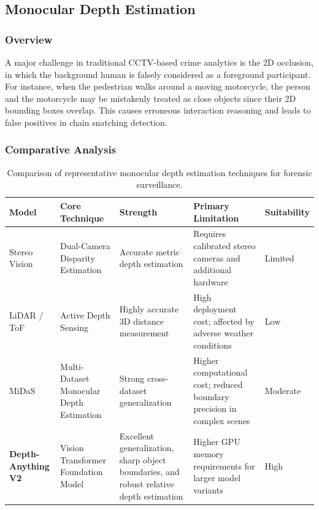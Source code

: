 \documentclass[conference]{IEEEtran}
\begin{document}
\subsection{Monocular Depth Estimation}
\subsubsection{Overview}
A major challenge in traditional CCTV-based crime analytics is the 2D occlusion, in which the background human is falsely considered as a foreground participant. For instance, when the pedestrian walks around a moving motorcycle, the person and the motorcycle may be mistakenly treated as close objects since their 2D bounding boxes overlap. This causes erroneous interaction reasoning and leads to false positives in chain snatching detection.

\subsubsection{Comparative Analysis}

\begin{table}[!t]
\centering
\scriptsize
\renewcommand{\arraystretch}{1.2}
\caption{Comparison of representative monocular depth estimation techniques for forensic surveillance.}
\label{tab:depth_comparison}

\begin{tabular}{|l|p{3.0cm}|p{3.6cm}|p{3.9cm}|p{2.4cm}|}
\hline
\textbf{Model} &
\textbf{Core Technique} &
\textbf{Strength} &
\textbf{Primary Limitation} &
\textbf{Suitability} \\ \hline

Stereo Vision &
Dual-Camera Disparity Estimation &
Accurate metric depth estimation &
Requires calibrated stereo cameras and additional hardware &
Limited \\ \hline

LiDAR / ToF &
Active Depth Sensing &
Highly accurate 3D distance measurement &
High deployment cost; affected by adverse weather conditions &
Low \\ \hline

MiDaS~\cite{monovit} &
Multi-Dataset Monocular Depth Estimation &
Strong cross-dataset generalization &
Higher computational cost; reduced boundary precision in complex scenes &
Moderate \\ \hline

\textbf{Depth-Anything V2}~\cite{yang2024depth} &
Vision Transformer Foundation Model &
Excellent generalization, sharp object boundaries, and robust relative depth estimation &
Higher GPU memory requirements for larger model variants &
High \\ \hline

\end{tabular}

\end{table}
\end{document}
